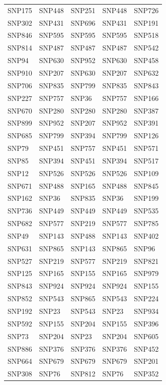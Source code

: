 \begin{table}[ht]
\begin{tabular}{lllll}
  SNP175 & SNP448 & SNP251 & SNP448 & SNP726 \\ 
  SNP302 & SNP431 & SNP696 & SNP431 & SNP191 \\ 
  SNP846 & SNP595 & SNP595 & SNP595 & SNP518 \\ 
  SNP814 & SNP487 & SNP487 & SNP487 & SNP542 \\ 
  SNP94 & SNP630 & SNP952 & SNP630 & SNP458 \\ 
  SNP910 & SNP207 & SNP630 & SNP207 & SNP632 \\ 
  SNP706 & SNP835 & SNP799 & SNP835 & SNP843 \\ 
  SNP227 & SNP757 & SNP36 & SNP757 & SNP166 \\ 
  SNP670 & SNP280 & SNP280 & SNP280 & SNP387 \\ 
  SNP899 & SNP952 & SNP207 & SNP952 & SNP391 \\ 
  SNP685 & SNP799 & SNP394 & SNP799 & SNP126 \\ 
  SNP79 & SNP451 & SNP757 & SNP451 & SNP571 \\ 
  SNP85 & SNP394 & SNP451 & SNP394 & SNP517 \\ 
  SNP12 & SNP526 & SNP526 & SNP526 & SNP109 \\ 
  SNP671 & SNP488 & SNP165 & SNP488 & SNP845 \\ 
  SNP162 & SNP36 & SNP835 & SNP36 & SNP199 \\ 
  SNP736 & SNP449 & SNP449 & SNP449 & SNP535 \\ 
  SNP682 & SNP577 & SNP219 & SNP577 & SNP785 \\ 
  SNP49 & SNP143 & SNP488 & SNP143 & SNP402 \\ 
  SNP631 & SNP865 & SNP143 & SNP865 & SNP96 \\ 
  SNP527 & SNP219 & SNP577 & SNP219 & SNP821 \\ 
  SNP125 & SNP165 & SNP155 & SNP165 & SNP979 \\ 
  SNP843 & SNP924 & SNP924 & SNP924 & SNP155 \\ 
  SNP852 & SNP543 & SNP865 & SNP543 & SNP224 \\ 
  SNP192 & SNP23 & SNP543 & SNP23 & SNP934 \\ 
  SNP592 & SNP155 & SNP204 & SNP155 & SNP396 \\ 
  SNP73 & SNP204 & SNP23 & SNP204 & SNP605 \\ 
  SNP886 & SNP376 & SNP376 & SNP376 & SNP452 \\ 
  SNP664 & SNP679 & SNP679 & SNP679 & SNP201 \\ 
  SNP308 & SNP76 & SNP812 & SNP76 & SNP352 \\ 

\end{tabular}
\end{table}
